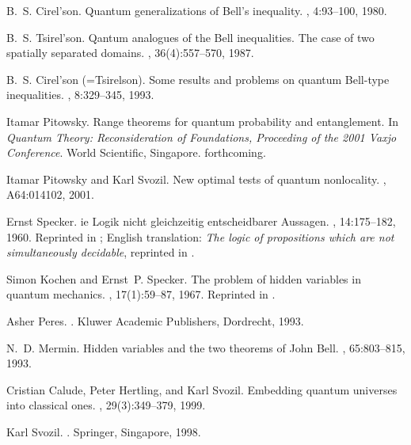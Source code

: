 \documentclass{epl}
\begin{document}
\begin{thebibliography}{10}
B.~S. Cirel'son.
\newblock Quantum generalizations of {B}ell's inequality.
, 4:93--100, 1980.

B.~S. Tsirel'son.
\newblock Qantum analogues of the {B}ell inequalities. {T}he case of two
  spatially separated domains.
, 36(4):557--570, 1987.

B.~S. {Cirel'son (=Tsirelson)}.
\newblock Some results and problems on quantum {B}ell-type inequalities.
, 8:329--345, 1993.

Itamar Pitowsky.
\newblock Range theorems for quantum probability and entanglement.
\newblock In {\em Quantum Theory: Reconsideration of Foundations, Proceeding of
  the 2001 Vaxjo Conference}. World Scientific, Singapore.
\newblock forthcoming.

Itamar Pitowsky and Karl Svozil.
\newblock New optimal tests of quantum nonlocality.
, A64:014102, 2001.

Ernst Specker.
ie {L}ogik nicht gleichzeitig entscheidbarer {A}ussagen.
, 14:175--182, 1960.
\newblock Reprinted in \cite[pp. 175--182]{specker-ges}; English translation:
  {\it The logic of propositions which are not simultaneously decidable},
  reprinted in \cite[pp. 135-140]{hooker}.

Simon Kochen and Ernst~P. Specker.
\newblock The problem of hidden variables in quantum mechanics.
, 17(1):59--87, 1967.
\newblock Reprinted in \cite[pp. 235--263]{specker-ges}.

Asher Peres.
.
\newblock Kluwer Academic Publishers, Dordrecht, 1993.

N.~D. Mermin.
\newblock Hidden variables and the two theorems of {J}ohn {B}ell.
, 65:803--815, 1993.

Cristian Calude, Peter Hertling, and Karl Svozil.
\newblock Embedding quantum universes into classical ones.
, 29(3):349--379, 1999.

Karl Svozil.
.
\newblock Springer, Singapore, 1998.


\end{thebibliography}
\end{document}
